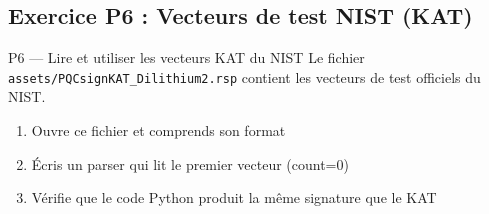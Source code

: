 \documentclass[12pt, a4paper]{article}
\begin{document}
\subsection{Exercice P6 : Vecteurs de test NIST (KAT)}

\begin{exercice}{P6 --- Lire et utiliser les vecteurs KAT du NIST}
Le fichier \texttt{assets/PQCsignKAT\_Dilithium2.rsp} contient les vecteurs de test officiels du NIST.
\begin{enumerate}
  \item Ouvre ce fichier et comprends son format
  \item Écris un parser qui lit le premier vecteur (count=0)
  \item Vérifie que le code Python produit la même signature que le KAT
\end{enumerate}
\end{exercice}
\end{document}
